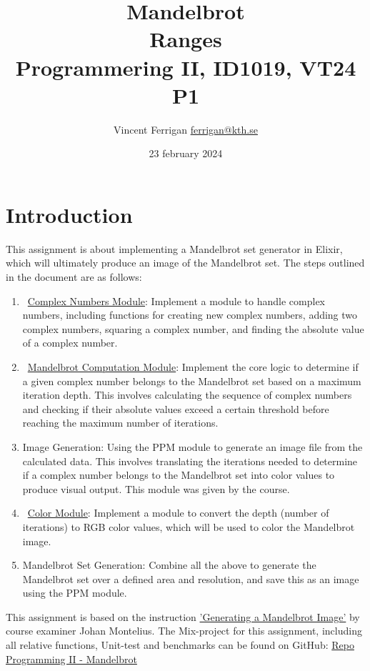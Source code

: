 \documentclass[a4paper,11pt]{article}
\begin{document}
\title{
    Mandelbrot
    \\Ranges
\\\small{Programmering II, ID1019, VT24 P1}
}
\author{Vincent Ferrigan \href{mailto:ferrigan@kth.se}{ferrigan@kth.se}}

\date{23 february 2024}
\maketitle

\section*{Introduction}
\label{sec:introduction}
This assignment is about implementing a Mandelbrot set generator in
Elixir, which will ultimately produce an image of the Mandelbrot set. 
The steps outlined in the document are as follows:
\begin{enumerate}
    \item~\hyperref[subsec:cmplx]{Complex Numbers Module}: Implement a module to handle complex numbers,
    including functions for creating new complex numbers, adding two complex
    numbers, squaring a complex number, and finding the absolute value of a
    complex number.
    \item~\hyperref[subsec:brot]{Mandelbrot Computation Module}: Implement the core logic to determine
    if a given complex number belongs to the Mandelbrot set based on a maximum
    iteration depth.
    This involves calculating the sequence of complex numbers
    and checking if their absolute values exceed a certain threshold before
    reaching the maximum number of iterations.
    \item Image Generation: Using the PPM module to generate an image file from
    the calculated data.
    This involves translating the iterations needed to
    determine if a complex number belongs to the Mandelbrot set into color
    values to produce visual output.
    This module was given by the course.
    \item~\hyperref[subsec:color]{Color Module}: Implement a module to convert the depth (number of
    iterations) to RGB color values, which will be used to color the Mandelbrot
    image.
    \item Mandelbrot Set Generation: Combine all the above to generate the
    Mandelbrot set over a defined area and resolution, and save this as an image
    using the PPM module.
\end{enumerate}
This assignment is based on the instruction
\href{https://people.kth.se/~johanmon/courses/id1019/seminars/mandel/mandel.pdf}{'Generating a Mandelbrot Image'}
by course examiner Johan Montelius.
The Mix-project for this assignment, including all relative functions, Unit-test and benchmarks can be found on GitHub:
\href{https://github.com/VincentFerrigan/kth-id1019-programming-ii/tree/main/tasks/7/mandelbrot}{Repo Programming II - Mandelbrot}%
\end{document}
